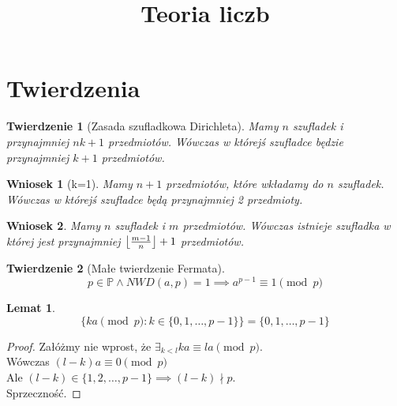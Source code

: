 \documentclass{article}
\DeclarePairedDelimiter\floor{\lfloor}{\rfloor}
\theoremstyle{break}
\newtheorem{theorem}{Twierdzenie}
\newtheorem{corollary}{Wniosek}[theorem]
\newtheorem{lemma}{Lemat}
\newtheorem{proof}{Dowód}
\begin{document}
\title{Teoria liczb}

\maketitle

\section{Twierdzenia}

\begin{theorem}[Zasada szufladkowa Dirichleta]
Mamy $n$ szufladek i przynajmniej $nk + 1$ przedmiotów. Wówczas w którejś szufladce będzie przynajmniej $k+1$ przedmiotów.
\end{theorem}
\begin{corollary}[k=1]
Mamy $n+1$ przedmiotów, które wkładamy do $n$ szufladek. Wówczas w którejś szufladce będą przynajmniej 2 przedmioty.
\end{corollary}

\begin{corollary}
Mamy $n$ szufladek i $m$ przedmiotów. Wówczas istnieje szufladka w której jest przynajmniej $ \floor*{\frac{m-1}{n}} + 1 $ przedmiotów.
\end{corollary}

\begin{theorem}[Małe twierdzenie Fermata]
\begin{displaymath}
p \in \mathbb{P} \land NWD(a,p) = 1 \implies a^{p-1} \equiv 1 \pmod{p}
\end{displaymath}
\end{theorem}

\begin{lemma}
\begin{displaymath}
\{ka \pmod{p} : k \in \{0,1, \dots, p-1 \}\} = \{0,1, \dots, p-1 \}
\end{displaymath}
\end{lemma}
\begin{proof}
Załóżmy nie wprost, że $\exists_{k < l} ka \equiv la \pmod{p} $. \\
Wówczas $ (l-k)a \equiv 0 \pmod{p}$\\
Ale $(l-k) \in \{1, 2, \dots, p-1\} \implies (l-k) \nmid p$. \\
Sprzeczność.
\end{proof}
\end{document}
